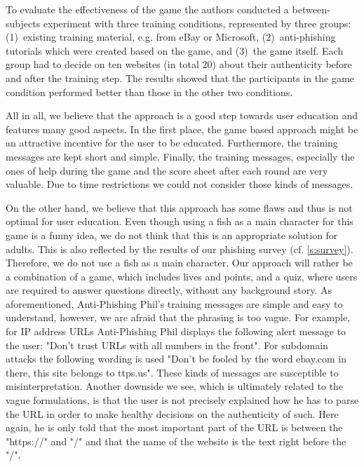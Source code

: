 \begin{description}[leftmargin=0cm]
\item[Game Evaluation:] To evaluate the effectiveness of the game the authors conducted a between-subjects experiment with three training conditions, represented by three groups: 
(1)~existing training material, e.g. from eBay or Microsoft, (2)~anti-phishing tutorials which were created based on the game, and (3)~the game itself. 
Each group had to decide on ten websites (in total 20) about their authenticity before and after the training step. 
The results showed that the participants in the game condition performed better than those in the other two conditions. 
\item[Positive Sides:] 
All in all, we believe that the approach is a good step towards user education and features many good aspects. 
In the first place, the game based approach might be an attractive incentive for the user to be educated. 
Furthermore, the training messages are kept short and simple. 
Finally, the training messages, especially the ones of help during the game and the score sheet after each round are very valuable. 
Due to time restrictions we could not consider those kinds of messages. 
\item[Downsides and Our Contributions:] 
On the other hand, we believe that this approach has some flaws and thus is not optimal for user education. 
Even though using a fish as a main character for this game is a funny idea, we do not think that this is an appropriate solution for adults. 
This is also reflected by the results of our phishing survey (cf. \autoref{s:survey}). 
Therefore, we do not use a fish as a main character. 
Our approach will rather be a combination of a game, which includes lives and points, and a quiz, where users are required to answer questions directly, without any background story.
As aforementioned, Anti-Phishing Phil's training messages are simple and easy to understand, however, we are afraid that the phrasing is too vague. 
For example, for IP address URLs Anti-Phishing Phil displays the following alert message to the user: 
"Don't trust URLs with all numbers in the front". 
For subdomain attacks the following wording is used "Don't be fooled by the word ebay.com in there, this site belongs to ttps.us". 
These kinds of messages are susceptible to misinterpretation. 
Another downside we see, which is ultimately related to the vague formulations, is that the user is not precisely explained how he has to parse the URL in order to make healthy decisions on the authenticity of such. 
Here again, he is only told that the most important part of the URL is between the "https://" and "/" and that the name of the website is the text right before the "/". 

\end{description}
